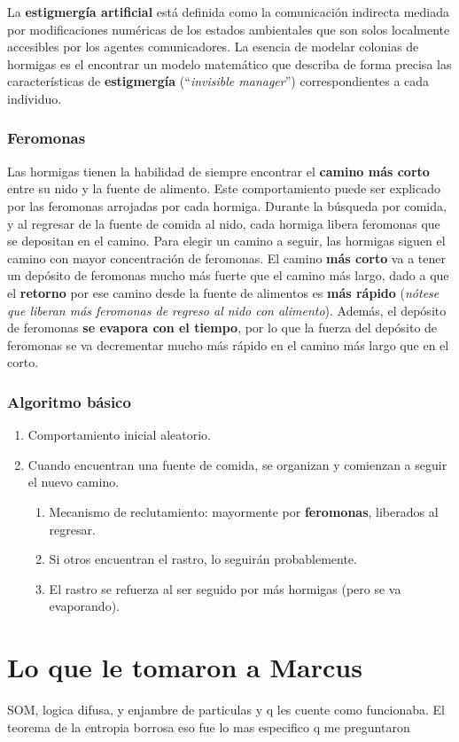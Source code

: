\documentclass[10pt,a4paper]{article}
\begin{document}
La \textbf{estigmergía artificial} está definida como la comunicación indirecta mediada por modificaciones numéricas de los estados ambientales que son solos localmente accesibles por los agentes comunicadores. La esencia de modelar colonias de hormigas es el encontrar un modelo matemático que describa de forma precisa las características de \textbf{estigmergía} (``\textit{invisible manager}'') correspondientes a cada individuo.

\subsubsection{Feromonas}

Las hormigas tienen la habilidad de siempre encontrar el \textbf{camino más corto} entre su nido y la fuente de alimento. Este comportamiento puede ser explicado por las feromonas arrojadas por cada hormiga. Durante la búsqueda por comida, y al regresar de la fuente de comida al nido, cada hormiga libera feromonas que se depositan en el camino. Para elegir un camino a seguir, las hormigas siguen el camino con mayor concentración de feromonas. El camino \textbf{más corto} va a tener un depósito de feromonas mucho más fuerte que el camino más largo, dado a que el \textbf{retorno} por ese camino desde la fuente de alimentos es \textbf{más rápido} (\textit{nótese que liberan más feromonas de regreso al nido con alimento}). Además, el depósito de feromonas \textbf{se evapora con el tiempo}, por lo que la fuerza del depósito de feromonas se va decrementar mucho más rápido en el camino más largo que en el corto.

\subsubsection{Algoritmo básico}

\begin{enumerate}
\item Comportamiento inicial aleatorio.
\item Cuando encuentran una fuente de comida, se organizan y comienzan a seguir el nuevo camino.
\begin{enumerate}[2.1]
\item Mecanismo de reclutamiento: mayormente por \textbf{feromonas}, liberados al regresar.
\item Si otros encuentran el rastro, lo seguirán probablemente.
\item El rastro se refuerza al ser seguido por más hormigas (pero se va evaporando).
\end{enumerate}
\end{enumerate}

\section{Lo que le tomaron a Marcus}
SOM, logica difusa, y enjambre de particulas y q les cuente como funcionaba. El teorema de la entropia borrosa eso fue lo mas especifico q me preguntaron
\end{document}
